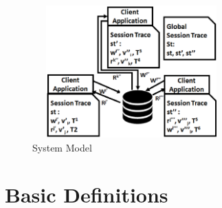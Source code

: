 \documentclass{sig-alternate-05-2015}
\begin{document}
\begin{figure}[!htbp]
        \centering
        \includegraphics[width=3in,height=2in]
                    {system.eps}
        \caption{System Model}
        \label{fig:System}
\end{figure}

  \section{Basic Definitions}
\end{document}
